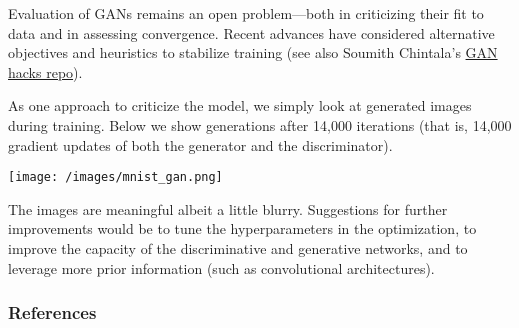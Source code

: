 Evaluation of GANs remains an open problem---both in criticizing their
fit to data and in assessing convergence.
Recent advances have considered alternative objectives and
heuristics to stabilize training (see also Soumith Chintala's
\href{https://github.com/soumith/ganhacks}{GAN hacks repo}).

As one approach to criticize the model, we simply look at generated
images during training. Below we show generations after 14,000
iterations (that is, 14,000 gradient updates of both the generator and
the discriminator).

\texttt{[image: /images/mnist\_gan.png]}

The images are meaningful albeit a little blurry. Suggestions for
further improvements would be to tune the hyperparameters in the
optimization, to improve the capacity of the discriminative and
generative networks, and to leverage more prior information (such as
convolutional architectures).

\subsubsection{References}\label{references}
